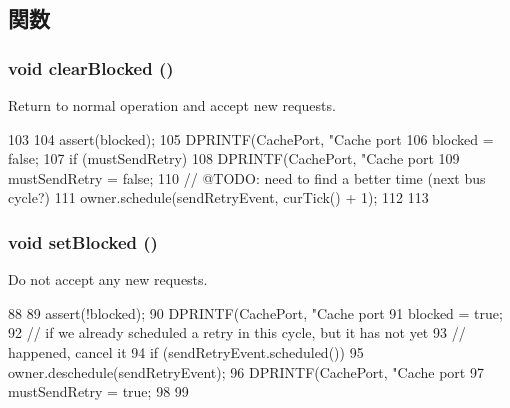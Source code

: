 \subsection{関数}
\hypertarget{classBaseCache_1_1CacheSlavePort_a67086ab888a89c3dbb6feaf48d83861b}{
\subsubsection[{clearBlocked}]{\setlength{\rightskip}{0pt plus 5cm}void clearBlocked ()}}
\label{classBaseCache_1_1CacheSlavePort_a67086ab888a89c3dbb6feaf48d83861b}
Return to normal operation and accept new requests. 


\begin{DoxyCode}
103 {
104     assert(blocked);
105     DPRINTF(CachePort, "Cache port %
106     blocked = false;
107     if (mustSendRetry) {
108         DPRINTF(CachePort, "Cache port %
109         mustSendRetry = false;
110         // @TODO: need to find a better time (next bus cycle?)
111         owner.schedule(sendRetryEvent, curTick() + 1);
112     }
113 }
\end{DoxyCode}
\hypertarget{classBaseCache_1_1CacheSlavePort_a357d28c375cfa16d73f0cc0dd9a6dd65}{
\subsubsection[{setBlocked}]{\setlength{\rightskip}{0pt plus 5cm}void setBlocked ()}}
\label{classBaseCache_1_1CacheSlavePort_a357d28c375cfa16d73f0cc0dd9a6dd65}
Do not accept any new requests. 


\begin{DoxyCode}
88 {
89     assert(!blocked);
90     DPRINTF(CachePort, "Cache port %
91     blocked = true;
92     // if we already scheduled a retry in this cycle, but it has not yet
93     // happened, cancel it
94     if (sendRetryEvent.scheduled()) {
95        owner.deschedule(sendRetryEvent);
96        DPRINTF(CachePort, "Cache port %
97        mustSendRetry = true;
98     }
99 }
\end{DoxyCode}


